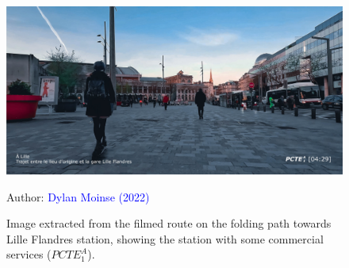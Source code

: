 \begin{refsegment}
    \begin{figure}[h!]\vspace*{4pt}
        \caption{Image extracted from the filmed route on the folding path towards Lille Flandres station, showing the station with some commercial services (\(PCTE^{A}_{1}\)).}
        \label{fig-chap5:pcte1a-commerces-lille-flandres}
        \centerline{\includegraphics[width=1\columnwidth]{src/Figures/Chap-5/EN_Detours_PCTE1_Access_13.jpg}}
        \vspace{5pt}
        \begin{flushright}\scriptsize{
        Author: \textcolor{blue}{Dylan Moinse (2022)}
        }\end{flushright}
    \end{figure}
  

\end{refsegment}
